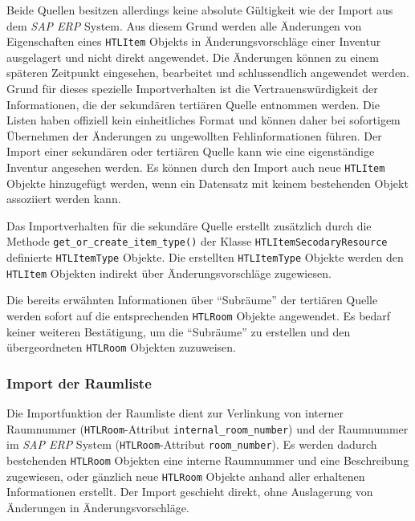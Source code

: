 Beide Quellen besitzen allerdings keine absolute Gültigkeit wie der
Import aus dem \emph{SAP ERP}
System. Aus diesem Grund werden alle Änderungen von Eigenschaften eines
\texttt{HTLItem} Objekts in Änderungsvorschläge einer Inventur
ausgelagert und nicht direkt angewendet. Die Änderungen können zu einem
späteren Zeitpunkt eingesehen, bearbeitet und schlussendlich angewendet
werden. Grund für dieses spezielle Importverhalten ist die
Vertrauenswürdigkeit der Informationen, die der sekundären \bzw{}
tertiären Quelle entnommen werden. Die Listen haben offiziell kein
einheitliches Format und können daher bei sofortigem Übernehmen der
Änderungen zu ungewollten Fehlinformationen führen. Der Import einer
sekundären oder tertiären Quelle kann wie eine eigenständige Inventur
angesehen werden. Es können durch den Import auch neue \texttt{HTLItem}
Objekte hinzugefügt werden, wenn ein Datensatz mit keinem bestehenden
Objekt assoziiert werden kann.

Das Importverhalten für die sekundäre Quelle erstellt zusätzlich durch
die Methode \texttt{get\_or\_create\_item\_type()} der Klasse
\texttt{HTLItemSecodaryResource} definierte \texttt{HTLItemType}
Objekte. Die erstellten \texttt{HTLItemType} Objekte werden den
\texttt{HTLItem} Objekten indirekt über Änderungsvorschläge zugewiesen.

Die bereits erwähnten Informationen über ``Subräume'' der tertiären
Quelle werden sofort auf die entsprechenden \texttt{HTLRoom} Objekte
angewendet. Es bedarf keiner weiteren Bestätigung, um die ``Subräume''
zu erstellen und den übergeordneten \texttt{HTLRoom} Objekten
zuzuweisen.

\hypertarget{import-der-raumliste}{%
\subsubsection{Import der Raumliste}\label{import-der-raumliste}}

Die Importfunktion der Raumliste dient zur Verlinkung von interner
Raumnummer (\texttt{HTLRoom}-Attribut \texttt{internal\_room\_number})
und der Raumnummer im \emph{SAP ERP}
System (\texttt{HTLRoom}-Attribut \texttt{room\_number}). Es werden
dadurch bestehenden \texttt{HTLRoom} Objekten eine interne Raumnummer
und eine Beschreibung zugewiesen, oder gänzlich neue \texttt{HTLRoom}
Objekte anhand aller erhaltenen Informationen erstellt. Der Import
geschieht direkt, ohne Auslagerung von Änderungen in
Änderungsvorschläge.

